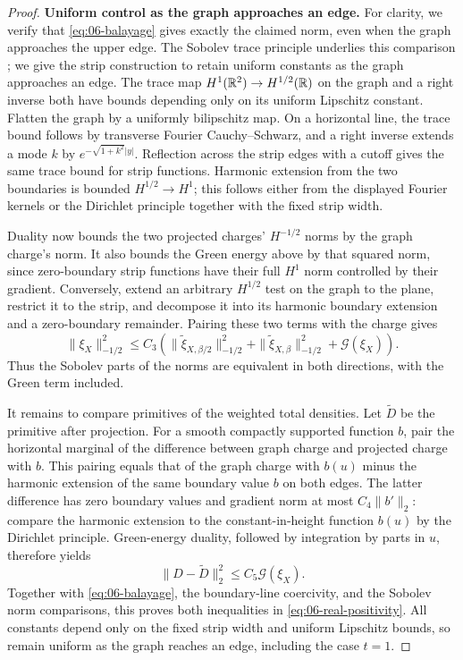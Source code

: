 \begin{proof}
\par\smallskip\noindent\textbf{Uniform control as the graph approaches an edge.}
For clarity, we verify that \eqref{eq:06-balayage} gives exactly
the claimed norm, even when the graph approaches the upper edge.
The Sobolev trace principle underlies this comparison
\cite[Theorem~1.I]{Gagliardo1957Trace}; we give the strip construction
to retain uniform constants as the graph approaches an edge.
The trace map \(H^1(\mathbb R^2)\to H^{1/2}(\mathbb R)\) on the graph and a right
inverse both have bounds depending only on its uniform Lipschitz
constant.  Flatten the graph by a uniformly bilipschitz map.
On a horizontal line, the trace bound follows by transverse
Fourier Cauchy--Schwarz, and a right inverse extends a mode \(k\)
by \(e^{-\sqrt{1+k^2}|y|}\).
Reflection across the strip edges with a cutoff gives the same
trace bound for strip functions.
Harmonic extension from the two boundaries is bounded
\(H^{1/2}\to H^1\); this follows either from the displayed
Fourier kernels or the Dirichlet principle together with the
fixed strip width.

Duality now bounds the two projected charges' \(H^{-1/2}\) norms
by the graph charge's norm.  It also bounds the Green energy above
by that squared norm, since zero-boundary strip functions have
their full \(H^1\) norm controlled by their gradient.
Conversely, extend an arbitrary \(H^{1/2}\) test on the graph to
the plane, restrict it to the strip, and decompose it into its
harmonic boundary extension and a zero-boundary remainder.
Pairing these two terms with the charge gives
\[
 \|\xi_X\|_{-1/2}^2
 \le C_3\left(
 \|\widetilde\xi_{X,\beta/2}\|_{-1/2}^2+
 \|\widetilde\xi_{X,\beta}\|_{-1/2}^2+
 \mathcal G(\xi_X)\right).
\]
Thus the Sobolev parts of the norms are equivalent in both
directions, with the Green term included.

It remains to compare primitives of the weighted total densities.
Let \(\widetilde D\) be the primitive after projection.
For a smooth compactly supported function \(b\), pair the
horizontal marginal of the difference between graph charge and
projected charge with \(b\).  This pairing equals that of the
graph charge with \(b(u)\) minus the harmonic extension of the
same boundary value \(b\) on both edges.
The latter difference has zero boundary values and gradient norm
at most \(C_4\|b'\|_2\): compare the harmonic extension to the
constant-in-height function \(b(u)\) by the Dirichlet principle.
Green-energy duality, followed by integration by parts in \(u\),
therefore yields
\[
 \|D-\widetilde D\|_2^2\le C_5\mathcal G(\xi_X).
\]
Together with \eqref{eq:06-balayage}, the boundary-line coercivity,
and the Sobolev norm comparisons, this proves both inequalities
in \eqref{eq:06-real-positivity}.
All constants depend only on the fixed strip width and uniform
Lipschitz bounds, so remain uniform as the graph reaches an edge,
including the case \(t=1\).
\end{proof}
